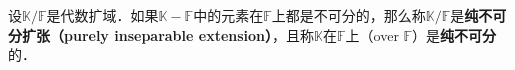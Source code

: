 

\begin{definition}{}

设$\mathbb{K}/\mathbb{F}$是代数扩域．如果$\mathbb{K}-\mathbb{F}$中的元素在$\mathbb{F}$上都是不可分的，那么称$\mathbb{K}/\mathbb{F}$是\textbf{纯不可分扩张（purely inseparable extension）}，且称$\mathbb{K}$在$\mathbb{F}$上（over $\mathbb{F}$）是\textbf{纯不可分}的．

\end{definition}































